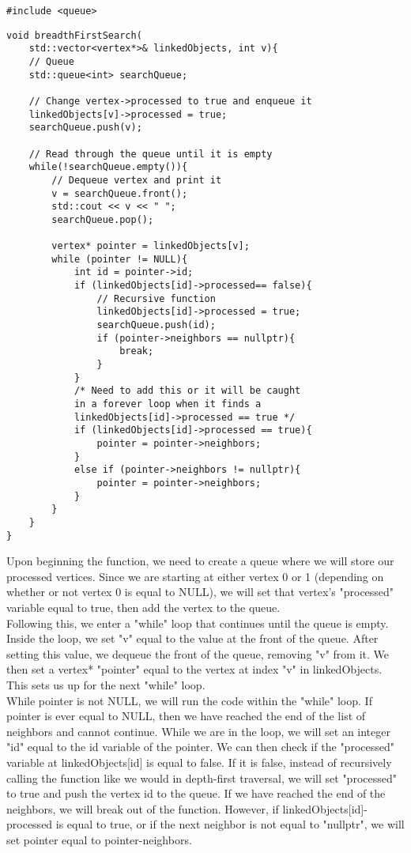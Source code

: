 \documentclass{article}
\begin{document}
\begin{lstlisting}
#include <queue>
\end{lstlisting}
\begin{lstlisting}
void breadthFirstSearch(
    std::vector<vertex*>& linkedObjects, int v){
    // Queue
    std::queue<int> searchQueue;

    // Change vertex->processed to true and enqueue it
    linkedObjects[v]->processed = true;
    searchQueue.push(v);

    // Read through the queue until it is empty
    while(!searchQueue.empty()){
        // Dequeue vertex and print it
        v = searchQueue.front();
        std::cout << v << " ";
        searchQueue.pop();

        vertex* pointer = linkedObjects[v];
        while (pointer != NULL){
            int id = pointer->id;
            if (linkedObjects[id]->processed== false){
                // Recursive function
                linkedObjects[id]->processed = true;
                searchQueue.push(id);
                if (pointer->neighbors == nullptr){
                    break;
                }
            } 
            /* Need to add this or it will be caught 
            in a forever loop when it finds a 
            linkedObjects[id]->processed == true */
            if (linkedObjects[id]->processed == true){
                pointer = pointer->neighbors;
            }
            else if (pointer->neighbors != nullptr){
                pointer = pointer->neighbors;
            }
        }
    }
}
\end{lstlisting}
Upon beginning the function, we need to create a queue where we will store our processed vertices. Since we are starting at either vertex 0 or 1 (depending on whether or not vertex 0 is equal to NULL), we will set that vertex's "processed" variable equal to true, then add the vertex to the queue. \\
Following this, we enter a "while" loop that continues until the queue is empty. Inside the loop, we set "v" equal to the value at the front of the queue. After setting this value, we dequeue the front of the queue, removing "v" from it. We then set a vertex* "pointer" equal to the vertex at index "v" in linkedObjects. This sets us up for the next "while" loop. \\
While pointer is not NULL, we will run the code within the "while" loop. If pointer is ever equal to NULL, then we have reached the end of the list of neighbors and cannot continue. While we are in the loop, we will set an integer "id" equal to the id variable of the pointer. We can then check if the "processed" variable at linkedObjects[id] is equal to false. If it is false, instead of recursively calling the function like we would in depth-first traversal, we will set "processed" to true and push the vertex id to the queue. If we have reached the end of the neighbors, we will break out of the function. However, if linkedObjects[id]-\>processed is equal to true, or if the next neighbor is not equal to "nullptr", we will set pointer equal to pointer-\>neighbors. \\
\end{document}
